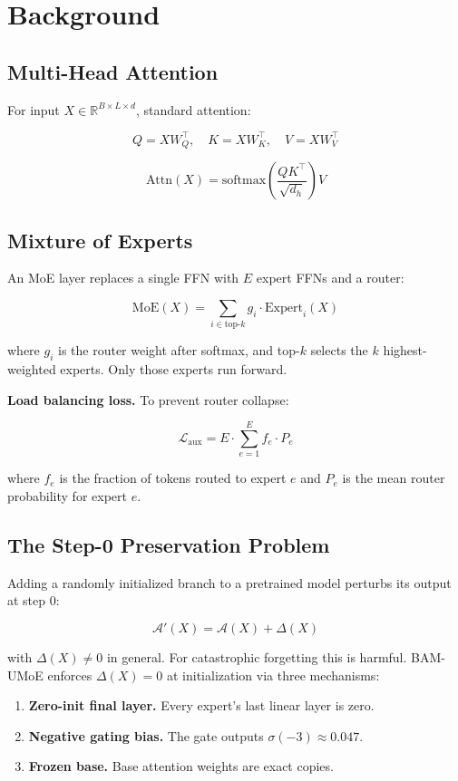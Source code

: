 \section{Background}

\subsection{Multi-Head Attention}

For input $X \in \mathbb{R}^{B \times L \times d}$, standard attention:

\[
Q = X W_Q^\top, \quad K = X W_K^\top, \quad V = X W_V^\top
\]

\[
\text{Attn}(X) = \text{softmax}\!\left(\frac{Q K^\top}{\sqrt{d_h}}\right) V
\]

\subsection{Mixture of Experts}

An MoE layer replaces a single FFN with $E$ expert FFNs and a router:

\[
\text{MoE}(X) = \sum_{i \in \text{top-}k} g_i \cdot \text{Expert}_i(X)
\]

where $g_i$ is the router weight after softmax, and top-$k$ selects the 
$k$ highest-weighted experts. Only those experts run forward.

\textbf{Load balancing loss.} To prevent router collapse:

\[
\mathcal{L}_\text{aux} = E \cdot \sum_{e=1}^{E} f_e \cdot P_e
\]

where $f_e$ is the fraction of tokens routed to expert $e$ and $P_e$ is the 
mean router probability for expert $e$.

\subsection{The Step-0 Preservation Problem}

Adding a randomly initialized branch to a pretrained model perturbs its 
output at step 0:

\[
\mathcal{A}'(X) = \mathcal{A}(X) + \Delta(X)
\]

with $\Delta(X) \neq 0$ in general. For catastrophic forgetting this is 
harmful. BAM-UMoE enforces $\Delta(X) = 0$ at initialization via three 
mechanisms:

\begin{enumerate}
\item \textbf{Zero-init final layer.} Every expert's last linear layer is zero.
\item \textbf{Negative gating bias.} The gate outputs $\sigma(-3) \approx 0.047$.
\item \textbf{Frozen base.} Base attention weights are exact copies.

\end{enumerate}

